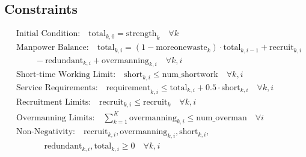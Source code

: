 \documentclass{article}
\begin{document}
\subsection*{Constraints}
\begin{align*}
& \text{Initial Condition:} \quad \text{total}_{k,0} = \text{strength}_{k} \quad \forall k \\
& \text{Manpower Balance:} \quad \text{total}_{k,i} = (1 - \text{moreonewaste}_{k}) \cdot \text{total}_{k,i-1} + \text{recruit}_{k,i} \\
& \quad \quad \ - \text{redundant}_{k,i} + \text{overmanning}_{k,i} \quad \forall k, i \\
& \text{Short-time Working Limit:} \quad \text{short}_{k,i} \leq \text{num_shortwork} \quad \forall k, i \\
& \text{Service Requirements:} \quad \text{requirement}_{k,i} \leq \text{total}_{k,i} + 0.5 \cdot \text{short}_{k,i} \quad \forall k, i \\
& \text{Recruitment Limits:} \quad \text{recruit}_{k,i} \leq \text{recruit}_{k} \quad \forall k, i \\
& \text{Overmanning Limits:} \quad \sum_{k=1}^{K} \text{overmanning}_{k, i} \leq \text{num_overman} \quad \forall i \\
& \text{Non-Negativity:} \quad \text{recruit}_{k,i}, \text{overmanning}_{k,i}, \text{short}_{k,i}, \\
& \quad \quad \ \ \ \ \ \ \text{redundant}_{k,i}, \text{total}_{k,i} \geq 0 \quad \forall k, i
\end{align*}
\end{document}
